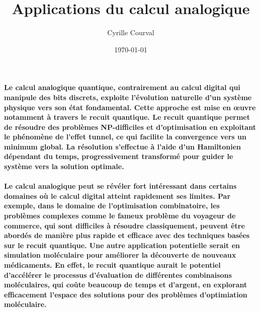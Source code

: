 \documentclass[12pt]{article}
\title{Applications du calcul analogique}
\author{Cyrille Courval}
\date{\selectlanguage{french}\today}%
\begin{document}
\maketitle
\thispagestyle{empty}

\paragraph{\normalfont Le calcul analogique quantique, contrairement au calcul digital qui manipule des bits discrets, exploite l’évolution naturelle d’un système physique vers son état fondamental. Cette approche est mise en œuvre notamment à travers le recuit quantique.
Le recuit quantique permet de résoudre des problèmes NP-difficiles et d’optimisation en exploitant le phénomène de l’effet tunnel, ce qui facilite la convergence vers un minimum global. La résolution s’effectue à l’aide d’un Hamiltonien dépendant du temps, progressivement transformé pour guider le système vers la solution optimale.}

\paragraph{\normalfont Le calcul analogique peut se révéler fort intéressant dans certains domaines où le calcul digital atteint rapidement ses limites. Par exemple, dans le domaine de l'optimisation combinatoire, les problèmes complexes comme le fameux problème du voyageur de commerce, qui sont difficiles à résoudre classiquement, peuvent être 
abordés de manière plus rapide et efficace avec des techniques basées sur le recuit quantique. Une autre application potentielle serait en simulation moléculaire pour améliorer la découverte de nouveaux médicaments. En effet, le recuit quantique aurait le potentiel d'accélérer le processus d'évaluation de différentes combinaisons moléculaires, qui coûte beaucoup de temps et d'argent, en explorant efficacement l'espace des solutions pour des 
problèmes d'optimiation moléculaire.}
\end{document}
